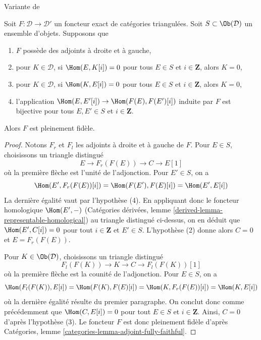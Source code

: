 \begin{lemma}
\label{lemma-get-fully-faithful}
\begin{reference}
Variante de \cite[Lemme 2.15]{Orlov-K3}
\end{reference}
Soit $F : \mathcal{D} \to \mathcal{D}'$ un foncteur exact de
catégories triangulées. Soit $S \subset \Ob(\mathcal{D})$ un
ensemble d'objets. Supposons que
\begin{enumerate}
\item $F$ possède des adjoints à droite et à gauche,
\item pour $K \in \mathcal{D}$, si $\Hom(E, K[i]) = 0$ pour tous
$E \in S$ et $i \in \mathbf{Z}$, alors $K = 0$,
\item pour $K \in \mathcal{D}$, si $\Hom(K, E[i]) = 0$ pour tous
$E \in S$ et $i \in \mathbf{Z}$, alors $K = 0$,
\item l'application $\Hom(E, E'[i]) \to \Hom(F(E), F(E')[i])$ induite par $F$
est bijective pour tous $E, E' \in S$ et $i \in \mathbf{Z}$.
\end{enumerate}
Alors $F$ est pleinement fidèle.
\end{lemma}

\begin{proof}
Notons $F_r$ et $F_l$ les adjoints à droite et à gauche de $F$. Pour
$E \in S$, choisissons un triangle distingué
$$
E \to F_r(F(E)) \to C \to E[1]
$$
où la première flèche est l'unité de l'adjonction. Pour $E' \in S$, on a
$$
\Hom(E', F_r(F(E))[i]) = \Hom(F(E'), F(E)[i]) = \Hom(E', E[i])
$$
La dernière égalité vaut par l'hypothèse (4).
En appliquant donc le foncteur homologique $\Hom(E', -)$
(Catégories dérivées, lemme \ref{derived-lemma-representable-homological})
au triangle distingué ci-dessus, on en déduit que $\Hom(E', C[i]) = 0$
pour tout $i \in \mathbf{Z}$ et $E' \in S$. L'hypothèse (2) donne alors
$C = 0$ et $E = F_r(F(E))$.

\medskip\noindent
Pour $K \in \Ob(\mathcal{D})$, choisissons un triangle distingué
$$
F_l(F(K)) \to K \to C \to F_l(F(K))[1]
$$
où la première flèche est la counité de l'adjonction. Pour $E \in S$,
on a
$$
\Hom(F_l(F(K)), E[i]) = \Hom(F(K), F(E)[i]) =
\Hom(K, F_r(F(E))[i]) = \Hom(K, E[i])
$$
où la dernière égalité résulte du premier paragraphe.
On conclut donc comme précédemment que $\Hom(C, E[i]) = 0$ pour tout $E \in S$
et $i \in \mathbf{Z}$. Ainsi, $C = 0$ d'après l'hypothèse (3).
Le foncteur $F$ est donc pleinement fidèle d'après Catégories, lemme
\ref{categories-lemma-adjoint-fully-faithful}.
\end{proof}

